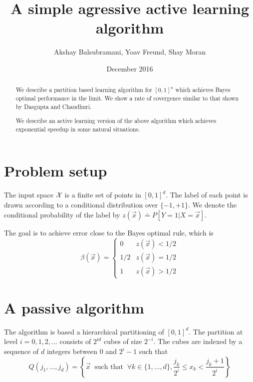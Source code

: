 \documentclass{article}
\title{A simple agressive active learning algorithm}
\author{Akshay Balsubramani, Yoav Freund, Shay Moran}
\date{December 2016}
\newcommand{\X}{{\cal X}}
\newcommand{\x}{\vec{x}}
\newcommand{\outcome}{z}
\begin{document}
\maketitle

\begin{abstract}
We describe a partition based learning algorithm for $[0,1]^n$ which
achieves Bayes optimal performance in the limit. We show
a rate of covergence similar to that shown by Dasgupta and Chaudhuri.

We describe an active learning version of the above algorithm which
achieves exponential speedup in some natural situations.

\end{abstract}

\section{Problem setup}

The input space $\X$ is a finite set of points in $[0,1]^d$.
The label of each point is drawn according to a conditional
distribution over $\{-1,+1\}$. We denote the conditional probability
of the label by $\outcome(\x) \doteq P[Y=1 | X=\x]$.

The goal is to achieve error close to the Bayes optimal rule, which is
\[
\beta(\x) =
\begin{cases}
 0 & \outcome(\x)<1/2\\
 1/2 & \outcome(\x)=1/2\\
 1 & \outcome(\x)>1/2
\end{cases}
\]

\section{A passive algorithm}

The algorithm is based a hierarchical partitioning of $[0,1]^d$.
The partition at level $i = 0,1,2,\ldots$ consists of $2^{id}$ cubes
of size $2^{-i}$. The cubes are indexed by a sequence of $d$
integers between $0$ and $2^i-1$ such that
\[
Q(j_1,\ldots,j_d) = \left\{\x\;\; \text{such that}\;\;
\forall k\in\{1,\ldots,d\},  \frac{j_k}{2^i} \leq x_k < \frac{j_k+1}{2^i} \right\}
\]
\end{document}
